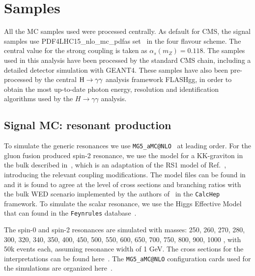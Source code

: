\section{Samples}
\label{sec:samples}

All the MC samples used were processed centrally. 
As default for CMS, the signal samples use PDF4LHC15\_nlo\_mc\_pdfas set~\cite{Carrazza:2015hva, Butterworth:2015oua, Dulat:2015mca,Harland-Lang:2014zoa, Ball:2014uwa} in the four flavour scheme. The central value for the strong coupling is taken as $\alpha_s(m_Z) = 0.118$. %
The samples used in this analysis have been processed by the standard CMS chain, including a detailed detector simulation with GEANT4. 
These samples have also been pre-processed by the central $\mathrm{H}\to\gamma\gamma$ analysis framework FLASHgg, in order to obtain the most up-to-date photon energy, resolution and identification algorithms used by the $H\rightarrow\gamma\gamma$ analysis.

\subsection{Signal MC: resonant production}

To simulate the generic resonances we use {\tt MG5\_aMC@NLO}~\cite{Alwall:2014hca} at leading order. 
For the gluon fusion produced spin-2 resonance, we use the model for a KK-graviton in the bulk described in~\cite{Oliveira:2010uv}, which is an adaptation of the RS1 model of Ref.~\cite{aquino}, introducing  the relevant coupling modifications. 
The model files can be found in~\cite{WEDtwiki} and it is found to agree at the level of cross sections and branching ratios with the bulk WED scenario implemented by the authors of~\cite{Tuomas} in the {\tt CalcHep}~\cite{Belyaev:2012qa} framework. 
To simulate the scalar resonance, we use the Higgs Effective Model ~\cite{heft} that can found in the {\tt Feynrules} database~\cite{Alloul:2013bka}.

The spin-0 and spin-2 resonances are simulated with masses: 250, 260, 270, 280, 300, 320, 340, 350, 400, 450, 500, 550, 600, 650, 700,
750, 800, 900, 1000 \GeV, with 50k events each, assuming resonance width of 1 GeV. 
The cross sections for the interpretations can be found here~\cite{cx}. The {\tt MG5\_aMC@NLO} configuration cards used for the simulations are organized here~\cite{cards}. 
 

